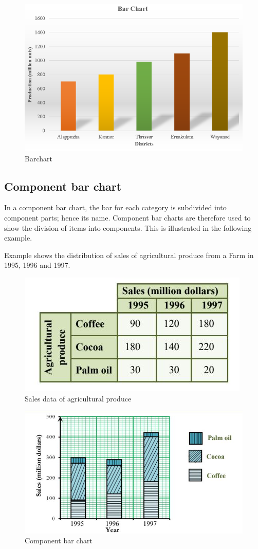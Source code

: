 \documentclass[
]{book}
\begin{document}
\begin{figure}

{\centering \includegraphics[width=0.8\linewidth]{images/barchart} 

}

\caption{Barchart}\label{fig:barchart}
\end{figure}

\subsection{Component bar chart}\label{component-bar-chart}

In a component bar chart, the bar for each category is subdivided into
component parts; hence its name. Component bar charts are therefore used
to show the division of items into components. This is illustrated in
the following example.

Example shows the distribution of sales of agricultural produce from a
Farm in 1995, 1996 and 1997.

\begin{figure}

{\centering \includegraphics[width=0.5\linewidth]{images/image14} 

}

\caption{Sales data of agricultural produce}\label{fig:componentdata}
\end{figure}

\begin{figure}

{\centering \includegraphics[width=0.5\linewidth]{images/image15} 

}

\caption{Component bar chart}\label{fig:componentbar}
\end{figure}
\end{document}
